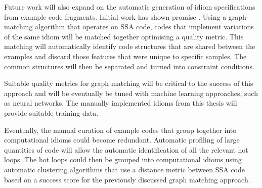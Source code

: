     Future work will also expand on the automatic generation of idiom
    specifications from example code fragments.
    Initial work has shown promise \citep{DBLP:conf/IEEEpact/CollieGO19}.
    Using a graph-matching algorithm that operates on SSA code, codes that
    implement variations of the same idiom will be matched together optimising
    a quality metric.
    This matching will automatically identify code structures that are shared
    between the examples and discard those features that were unique to
    specific samples.
    The common structures will then be separated and turned into constraint
    conditions.

    Suitable quality metrics for graph matching will be critical to the success
    of this approach and will be eventually be tuned with machine learning
    approaches, such as neural networks.
    The manually implemented idioms from this thesis will provide suitable
    training data.

    Eventually, the manual curation of example codes that group together into
    computational idioms could become redundant.
    Automatic profiling of large quantities of code will allow the automatic
    identification of all the relevant hot loops.
    The hot loops could then be grouped into computational idioms using
    automatic clustering algorithms that use a distance metric between SSA code
    based on a success score for the previously discussed graph matching
    approach.
